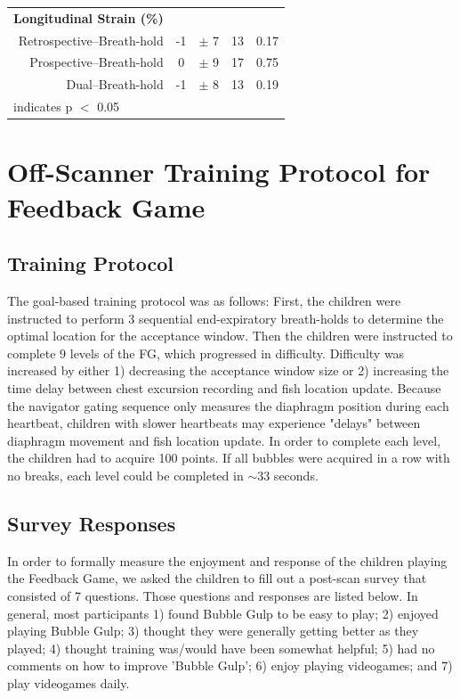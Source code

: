 \begin{appendices}
\begin{table}
\begin{tabular}{c c c c c}
			\multicolumn{1}{l}{\textbf{Longitudinal Strain (\%)}}                       						   & \multicolumn{4}{c}{}     \\
			\multicolumn{1}{r}{Retrospective--Breath-hold}  & \multicolumn{1}{c}{-1} & \multicolumn{1}{c}{$\pm$ 7} & \multicolumn{1}{c}{13}   & \multicolumn{1}{c}{0.17} \\
			\multicolumn{1}{r}{Prospective--Breath-hold}    & \multicolumn{1}{c}{0}  & \multicolumn{1}{c}{$\pm$ 9} & \multicolumn{1}{c}{17}   & \multicolumn{1}{c}{0.75} \\
			\multicolumn{1}{r}{Dual--Breath-hold}           & \multicolumn{1}{c}{-1} & \multicolumn{1}{c}{$\pm$ 8} & \multicolumn{1}{c}{13}   & \multicolumn{1}{c}{0.19} \\
			\bottomrule
			\multicolumn{5}{l}{\footnotesize* indicates p $<$ 0.05} \\                                 
		\end{tabular}
	\end{table}
	\chapter{Off-Scanner Training Protocol for Feedback Game}
	\section{Training Protocol}
	The goal-based training protocol was as follows: First, the children were instructed to perform 3 sequential end-expiratory breath-holds to determine the optimal location for the acceptance window. Then the children were instructed to complete 9 levels of the FG, which progressed in difficulty. Difficulty was increased by either 1) decreasing the acceptance window size or 2) increasing the time delay between chest excursion recording and fish location update. Because the navigator gating sequence only measures the diaphragm position during each heartbeat, children with slower heartbeats may experience "delays" between diaphragm movement and fish location update. In order to complete each level, the children had to acquire 100 points. If all bubbles were acquired in a row with no breaks, each level could be completed in $\sim$33 seconds.
	
	\section{Survey Responses}
	In order to formally measure the enjoyment and response of the children playing the Feedback Game, we asked the children to fill out a post-scan survey that consisted of 7 questions. Those questions and responses are listed below. In general, most participants 1) found Bubble Gulp to be easy to play; 2) enjoyed playing Bubble Gulp; 3) thought they were generally getting better as they played; 4) thought training was/would have been somewhat helpful; 5) had no comments on how to improve 'Bubble Gulp'; 6) enjoy playing videogames; and 7) play videogames daily.
	

\end{appendices}
